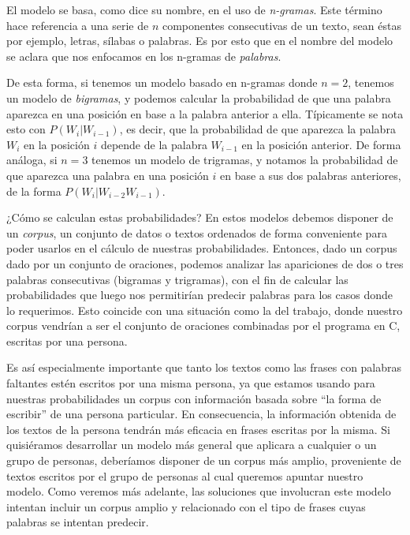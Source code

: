 \documentclass[a4paper]{article}
\begin{document}
El modelo se basa, como dice su nombre, en el uso de \textit{n-gramas}. Este término hace referencia a una serie de $n$ componentes consecutivas de un texto, sean éstas por ejemplo, letras, sílabas o palabras\cite{WikiNgram}. Es por esto que en el nombre del modelo se aclara que nos enfocamos en los n-gramas de \textit{palabras}.

De esta forma, si tenemos un modelo basado en n-gramas donde $n = 2$, tenemos un modelo de \textit{bigramas}, y podemos calcular la probabilidad de que una palabra aparezca en una posición en base a la palabra anterior a ella. Típicamente se nota esto con $P(W_i | W_{i-1})$, es decir, que la probabilidad de que aparezca la palabra $W_i$ en la posición $i$ depende de la palabra $W_{i-1}$ en la posición anterior. De forma análoga, si $n = 3$ tenemos un modelo de trigramas, y notamos la probabilidad de que aparezca una palabra en una posición $i$ en base a sus dos palabras anteriores, de la forma $P(W_i|W_{i-2}W_{i-1})$.

¿Cómo se calculan estas probabilidades? En estos modelos debemos disponer de un \textit{corpus}, un conjunto de datos o textos ordenados de forma conveniente para poder usarlos en el cálculo de nuestras probabilidades. Entonces, dado un corpus dado por un conjunto de oraciones, podemos analizar las apariciones de dos o tres palabras consecutivas (bigramas y trigramas), con el fin de calcular las probabilidades que luego nos permitirían predecir palabras para los casos donde lo requerimos. Esto coincide con una situación como la del trabajo, donde nuestro corpus vendrían a ser el conjunto de oraciones combinadas por el programa en C, escritas por una persona.

Es así especialmente importante que tanto los textos como las frases con palabras faltantes estén escritos por una misma persona, ya que estamos usando para nuestras probabilidades un corpus con información basada sobre ``la forma de escribir'' de una persona particular. En consecuencia, la información obtenida de los textos de la persona tendrán más eficacia en frases escritas por la misma. Si quisiéramos desarrollar un modelo más general que aplicara a cualquier o un grupo de personas, deberíamos disponer de un corpus más amplio, proveniente de textos escritos por el grupo de personas al cual queremos apuntar nuestro modelo. Como veremos más adelante, las soluciones que involucran este modelo intentan incluir un corpus amplio y relacionado con el tipo de frases cuyas palabras se intentan predecir.
\end{document}
